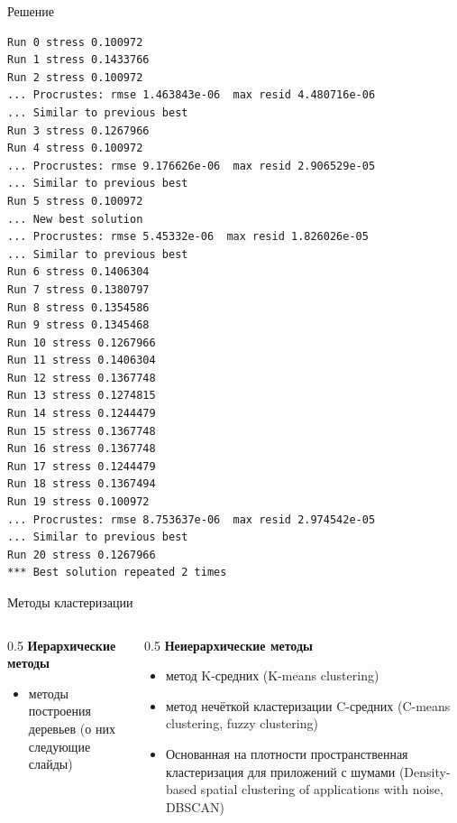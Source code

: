 \documentclass[
  ignorenonframetext,
  russian,
]{beamer}
\providecommand{\tightlist}{%
  \setlength{\itemsep}{0pt}\setlength{\parskip}{0pt}}
\begin{document}
\begin{frame}[fragile]{Решение}
\begin{verbatim}
Run 0 stress 0.100972 
Run 1 stress 0.1433766 
Run 2 stress 0.100972 
... Procrustes: rmse 1.463843e-06  max resid 4.480716e-06 
... Similar to previous best
Run 3 stress 0.1267966 
Run 4 stress 0.100972 
... Procrustes: rmse 9.176626e-06  max resid 2.906529e-05 
... Similar to previous best
Run 5 stress 0.100972 
... New best solution
... Procrustes: rmse 5.45332e-06  max resid 1.826026e-05 
... Similar to previous best
Run 6 stress 0.1406304 
Run 7 stress 0.1380797 
Run 8 stress 0.1354586 
Run 9 stress 0.1345468 
Run 10 stress 0.1267966 
Run 11 stress 0.1406304 
Run 12 stress 0.1367748 
Run 13 stress 0.1274815 
Run 14 stress 0.1244479 
Run 15 stress 0.1367748 
Run 16 stress 0.1367748 
Run 17 stress 0.1244479 
Run 18 stress 0.1367494 
Run 19 stress 0.100972 
... Procrustes: rmse 8.753637e-06  max resid 2.974542e-05 
... Similar to previous best
Run 20 stress 0.1267966 
*** Best solution repeated 2 times
\end{verbatim}
\end{frame}

\begin{frame}{Методы кластеризации}
\protect{}\label{ux43cux435ux442ux43eux434ux44b-ux43aux43bux430ux441ux442ux435ux440ux438ux437ux430ux446ux438ux438}
\begin{columns}[T]
\begin{column}{0.5\linewidth}
\textbf{Иерархические методы}

\begin{itemize}
\tightlist
\item
  методы построения деревьев (о них следующие слайды)
\end{itemize}
\end{column}

\begin{column}{0.5\linewidth}
\textbf{Неиерархические методы}

\begin{itemize}
\tightlist
\item
  метод K-средних (K-means clustering)
\item
  метод нечёткой кластеризации C-средних (C-means clustering, fuzzy
  clustering)
\item
  Основанная на плотности пространственная кластеризация для приложений
  с шумами (Density-based spatial clustering of applications with noise,
  DBSCAN)
\end{itemize}
\end{column}
\end{columns}
\end{frame}
\end{document}
